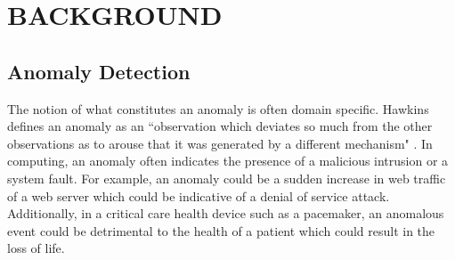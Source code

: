 %



\section{BACKGROUND}


\subsection{Anomaly Detection}

The notion of what constitutes an anomaly is often domain specific. Hawkins defines an anomaly as an ``observation which deviates so much from the other observations as to arouse that it was generated by a different mechanism" \cite{hawkins}. In computing, an anomaly often indicates the presence of a malicious intrusion or a system fault. For example, an anomaly could be a sudden increase in web traffic of a web server which could be indicative of a denial of service attack. Additionally, in a critical care health device such as a pacemaker, an anomalous event could be detrimental to the health of a patient which could result in the loss of life. 


